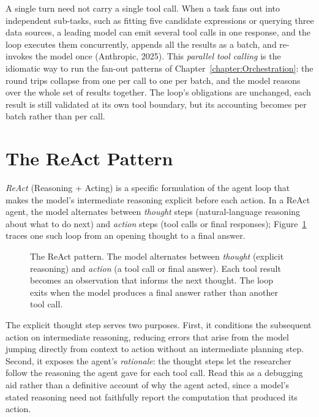\begin{remark}
A single turn need not carry a single tool call.
When a task fans out into independent sub-tasks, such as fitting five candidate expressions or querying three data sources, a leading model can emit several tool calls in one response, and the loop executes them concurrently, appends all the results as a batch, and re-invokes the model once (Anthropic, 2025).
This \emph{parallel tool calling} is the idiomatic way to run the fan-out patterns of Chapter~\ref{chapter:Orchestration}: the round trips collapse from one per call to one per batch, and the model reasons over the whole set of results together.
The loop's obligations are unchanged, each result is still validated at its own tool boundary, but its accounting becomes per batch rather than per call.
\end{remark}

\section{The ReAct Pattern}
\label{section:ReAct}

\emph{ReAct} (Reasoning + Acting) is a specific formulation of the agent loop that makes the model's intermediate reasoning explicit before each action.
In a ReAct agent, the model alternates between \emph{thought} steps (natural-language reasoning about what to do next) and \emph{action} steps (tool calls or final responses); Figure~\ref{figure:ReAct} traces one such loop from an opening thought to a final answer.

\begin{figure}[htb!]
\begin{center}

\caption{The ReAct pattern.
The model alternates between \emph{thought} (explicit reasoning) and \emph{action} (a tool call or final answer).
Each tool result becomes an observation that informs the next thought.
The loop exits when the model produces a final answer rather than another tool call.}
\label{figure:ReAct}
\end{center}
\end{figure}

The explicit thought step serves two purposes.
First, it conditions the subsequent action on intermediate reasoning, reducing errors that arise from the model jumping directly from context to action without an intermediate planning step.
Second, it exposes the agent's \emph{rationale}: the thought steps let the researcher follow the reasoning the agent gave for each tool call. Read this as a debugging aid rather than a definitive account of why the agent acted, since a model's stated reasoning need not faithfully report the computation that produced its action.

